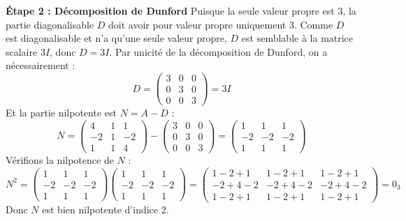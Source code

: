 \documentclass[11pt,a4paper]{article}
\begin{document}
\textbf{Étape 2 : Décomposition de Dunford}
Puisque la seule valeur propre est $3$, la partie diagonalisable $D$ doit avoir pour valeur propre uniquement $3$.
Comme $D$ est diagonalisable et n'a qu'une seule valeur propre, $D$ est semblable à la matrice scalaire $3I$, donc $D = 3I$.
Par unicité de la décomposition de Dunford, on a nécessairement :
$$ D = \begin{pmatrix} 3 & 0 & 0 \\ 0 & 3 & 0 \\ 0 & 0 & 3 \end{pmatrix} = 3I $$
Et la partie nilpotente est $N = A - D$ :
$$ N = \begin{pmatrix} 4 & 1 & 1 \\ -2 & 1 & -2 \\ 1 & 1 & 4 \end{pmatrix} - \begin{pmatrix} 3 & 0 & 0 \\ 0 & 3 & 0 \\ 0 & 0 & 3 \end{pmatrix} = \begin{pmatrix} 1 & 1 & 1 \\ -2 & -2 & -2 \\ 1 & 1 & 1 \end{pmatrix} $$
Vérifions la nilpotence de $N$ :
$$ N^2 = \begin{pmatrix} 1 & 1 & 1 \\ -2 & -2 & -2 \\ 1 & 1 & 1 \end{pmatrix} \begin{pmatrix} 1 & 1 & 1 \\ -2 & -2 & -2 \\ 1 & 1 & 1 \end{pmatrix} = \begin{pmatrix} 1-2+1 & 1-2+1 & 1-2+1 \\ -2+4-2 & -2+4-2 & -2+4-2 \\ 1-2+1 & 1-2+1 & 1-2+1 \end{pmatrix} = 0_3 $$
Donc $N$ est bien nilpotente d'indice 2.
\end{document}
